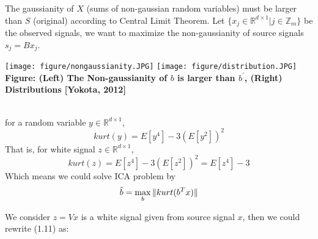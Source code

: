 \documentclass[a4 paper]{article}
\begin{document}
\par The gaussianity of $X$ (sums of non-gaussian random variables) must be larger than $S$ (original) according to Central Limit Theorem.
Let $\{x_j\in\mathbb{R}^{d\times1}|j\in\mathbb{Z}_m\}$ be the observed signals, we want to maximize the non-gaussianity of source signals $s_j=Bx_j$.\\
\begin{center}
    \texttt{[image: figure/nongaussianity.JPG]}
    \texttt{[image: figure/distribution.JPG]}\\
    \textbf{Figure:  (Left) The Non-gaussianity of $b$ is larger than $b^{'}$, (Right) Distributions [Yokota, 2012]}
\end{center}
\begin{tcolorbox}[colback=RoyalBlue!5!white,colframe=RoyalBlue!75!black,title=Kurtosis is a measure of non-gaussianity]
    \\
        for a random variable $y\in\mathbb{R}^{d\times 1}$,
       $$kurt(y)=E[y^4]-3(E[y^2])^2$$
    \tcblower
    That is, for white signal $z\in\mathbb{R}^{d\times1}$, $$kurt(z)=E[z^4]-3(E[z^2])^2=E[z^4]-3$$
    Which means we could solve ICA problem by
    \begin{equation}
        \hat{b}=\max_{b}\large\|kurt(b^Tx)\large\|
    \end{equation}
\end{tcolorbox}
We consider $z=Vx$ is a white signal given from source signal $x$, then we could rewrite (1.11) as: 
\end{document}
